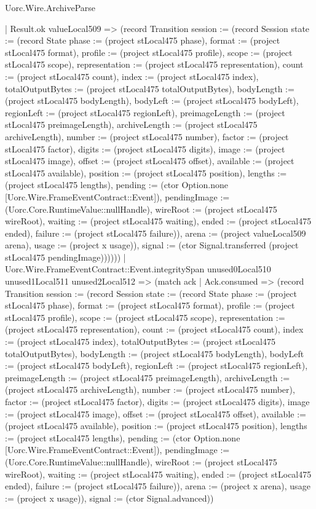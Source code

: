\begin{lexlean}{Uorc.Wire.ArchiveParse}
\begin{semanticmodule}
{            | Result.ok valueLocal509 => (record Transition {session := (record Session {state := (record State {phase := (project stLocal475 phase), format := (project stLocal475 format), profile := (project stLocal475 profile), scope := (project stLocal475 scope), representation := (project stLocal475 representation), count := (project stLocal475 count), index := (project stLocal475 index), totalOutputBytes := (project stLocal475 totalOutputBytes), bodyLength := (project stLocal475 bodyLength), bodyLeft := (project stLocal475 bodyLeft), regionLeft := (project stLocal475 regionLeft), preimageLength := (project stLocal475 preimageLength), archiveLength := (project stLocal475 archiveLength), number := (project stLocal475 number), factor := (project stLocal475 factor), digits := (project stLocal475 digits), image := (project stLocal475 image), offset := (project stLocal475 offset), available := (project stLocal475 available), position := (project stLocal475 position), lengths := (project stLocal475 lengths), pending := (ctor Option.none [Uorc.Wire.FrameEventContract::Event]), pendingImage := (Uorc.Core.RuntimeValue::nullHandle), wireRoot := (project stLocal475 wireRoot), waiting := (project stLocal475 waiting), ended := (project stLocal475 ended), failure := (project stLocal475 failure)}), arena := (project valueLocal509 arena), usage := (project x usage)}), signal := (ctor Signal.transferred (project stLocal475 pendingImage))}))))
        | Uorc.Wire.FrameEventContract::Event.integritySpan unused0Local510 unused1Local511 unused2Local512 => (match ack
          | Ack.consumed => (record Transition {session := (record Session {state := (record State {phase := (project stLocal475 phase), format := (project stLocal475 format), profile := (project stLocal475 profile), scope := (project stLocal475 scope), representation := (project stLocal475 representation), count := (project stLocal475 count), index := (project stLocal475 index), totalOutputBytes := (project stLocal475 totalOutputBytes), bodyLength := (project stLocal475 bodyLength), bodyLeft := (project stLocal475 bodyLeft), regionLeft := (project stLocal475 regionLeft), preimageLength := (project stLocal475 preimageLength), archiveLength := (project stLocal475 archiveLength), number := (project stLocal475 number), factor := (project stLocal475 factor), digits := (project stLocal475 digits), image := (project stLocal475 image), offset := (project stLocal475 offset), available := (project stLocal475 available), position := (project stLocal475 position), lengths := (project stLocal475 lengths), pending := (ctor Option.none [Uorc.Wire.FrameEventContract::Event]), pendingImage := (Uorc.Core.RuntimeValue::nullHandle), wireRoot := (project stLocal475 wireRoot), waiting := (project stLocal475 waiting), ended := (project stLocal475 ended), failure := (project stLocal475 failure)}), arena := (project x arena), usage := (project x usage)}), signal := (ctor Signal.advanced)})
}
\end{semanticmodule}
\end{lexlean}
